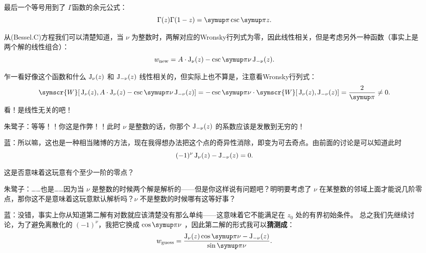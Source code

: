 最后一个等号用到了 \(\Gamma \)函数的余元公式：
\[
	\Gamma (z)\Gamma (1-z)=\symup \pi \csc\symup  \pi z
	.\]

从(Bessel.C)方程我们可以清楚知道，当 \(\nu \) 为整数时，两解对应的Wronsky行列式为零，因此线性相关，但是考虑另外一种函数（事实上是两个解的线性组合）：
\[
	w_{\rm new} = A \cdot \besselj_ \nu (z) - \csc \symup \pi \nu  \besselj_{-\nu }(z)
	.\]

乍一看好像这个函数和什么 \( \operatorname{J}_ \nu (z)\) 和 \( \operatorname{J}_ {-\nu} (z)\) 线性相关的，但实际上也不算是，注意看Wronsky行列式：
\[
	\symscr{W}[\,\besselj_{\nu}(z),A \cdot \besselj_ \nu (z) - \csc \symup \pi \nu  \besselj_{-\nu }(z)]=-\csc  \symup \pi  \nu\cdot  \symscr{W}[\,\besselj_{\nu}(z),\besselj_{- \nu} (z)]= \frac{2}{\symup \pi }\neq 0
	.\]
看！是线性无关的吧！

朱鹭子：等等！！你这是作弊！！此时 \(\nu \) 是整数的话，你那个 \(\operatorname{J}_{-\nu }(z)\) 的系数应该是发散到无穷的！

蓝：所以嘛，这也是一种相当赌博的方法，现在我得想办法把这个点的奇异性消除，即变为可去奇点。由前面的讨论是可以知道此时
\[
	(-1)^{\nu }\operatorname{J} _ \nu (z)-\operatorname{J} _ {-\nu }(z)=0
	.\]

这是否意味着这玩意有个至少一阶的零点？

朱鹭子：……也是……因为当 \(\nu \) 是整数的时候两个解是解析的——但是你这样说有问题吧？明明要考虑了 \(\nu \) 在某整数的邻域上面才能说几阶零点，那你这不是意味着这玩意默认解析吗？\(\nu \) 不是整数的时候哪有这等好事？

蓝：没错，事实上你从知道第二解有对数就应该清楚没有那么单纯——这意味着它不能满足在 \(z_0\) 处的有界初始条件。 总之我们先继续讨论，为了避免离散化的 \((-1)^{\nu}\)，我把它换成 \(\cos \symup \pi \nu \) ，因此第二解的形式我可以\textbf{猜测成}：
\[
	w_{\rm guess}= \frac{\besselj_ \nu (z)\cos \symup \pi \nu - \besselj_{ -\nu} (z)}{\sin \symup \pi  \nu }
	.\]

